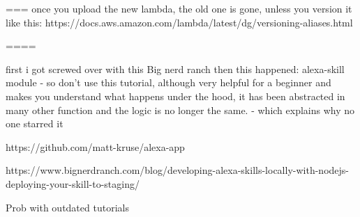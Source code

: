  ===
once you upload the new lambda, the old one is gone, unless you version it like this:
https://docs.aws.amazon.com/lambda/latest/dg/versioning-aliases.html



====

first i got screwed over with this Big nerd ranch then this happened: alexa-skill module
- so don't use this tutorial, although very helpful for a beginner and makes you understand what happens under the hood, it has been abstracted in many other function and the logic is no longer the same. - which explains why no one starred it

https://github.com/matt-kruse/alexa-app

https://www.bignerdranch.com/blog/developing-alexa-skills-locally-with-nodejs-deploying-your-skill-to-staging/




Prob with outdated tutorials